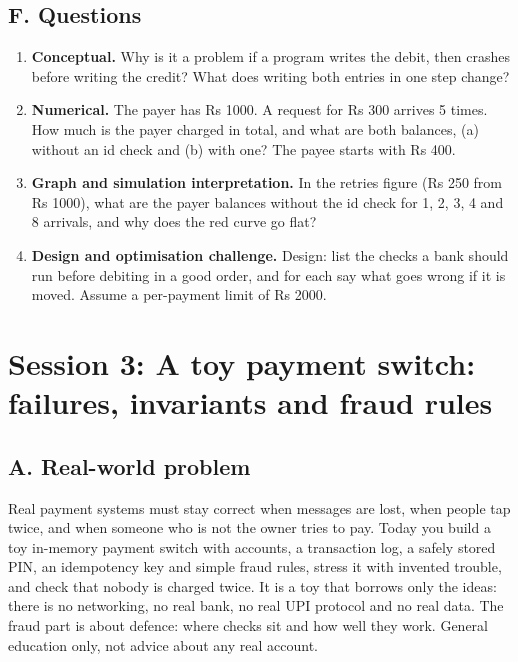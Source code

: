 \documentclass[11pt,a4paper]{article}
\begin{document}
\subsection*{F. Questions}
\begin{enumerate}[nosep]
\item \textbf{Conceptual.} Why is it a problem if a program writes the debit, then crashes before writing the credit? What does writing both entries in one step change?
\item \textbf{Numerical.} The payer has Rs 1000. A request for Rs 300 arrives 5 times. How much is the payer charged in total, and what are both balances, (a) without an id check and (b) with one? The payee starts with Rs 400.
\item \textbf{Graph and simulation interpretation.} In the retries figure (Rs 250 from Rs 1000), what are the payer balances without the id check for 1, 2, 3, 4 and 8 arrivals, and why does the red curve go flat?
\item \textbf{Design and optimisation challenge.} Design: list the checks a bank should run before debiting in a good order, and for each say what goes wrong if it is moved. Assume a per-payment limit of Rs 2000.
\end{enumerate}

\section{Session 3: A toy payment switch: failures, invariants and fraud rules}

\subsection*{A. Real-world problem}
Real payment systems must stay correct when messages are lost, when people tap twice, and when someone who is not the owner tries to pay. Today you build a toy in-memory payment switch with accounts, a transaction log, a safely stored PIN, an idempotency key and simple fraud rules, stress it with invented trouble, and check that nobody is charged twice. It is a toy that borrows only the ideas: there is no networking, no real bank, no real UPI protocol and no real data. The fraud part is about defence: where checks sit and how well they work. General education only, not advice about any real account.
\end{document}
